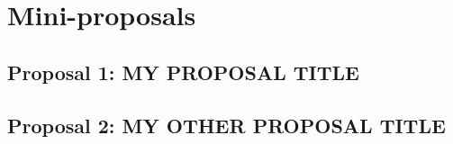 

\section{Mini-proposals}

\subsection{Proposal 1: MY PROPOSAL TITLE} %


\subsection{Proposal 2: MY OTHER PROPOSAL TITLE} %


